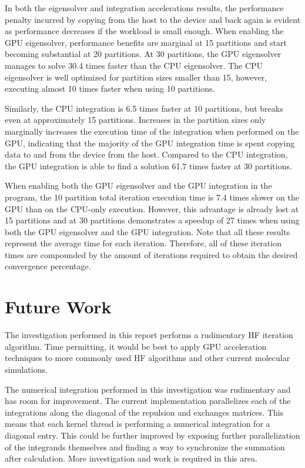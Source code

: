 \documentclass[conference, twoside]{IEEEtran}
\begin{document}
In both the eigensolver and integration accelerations results, the performance penalty incurred by copying from the host to the device and back again is evident as performance decreases if the workload is small enough. When enabling the GPU eigensolver, performance benefits are marginal at 15 partitions and start becoming substantial at 20 partitions. At 30 partitions, the GPU eigensolver manages to solve 30.4 times faster than the CPU eigensolver. The CPU eigensolver is well optimized for partition sizes smaller than 15, however, executing almost 10 times faster when using 10 partitions.

Similarly, the CPU integration is 6.5 times faster at 10 partitions, but breaks even at approximately 15 partitions. Increases in the partition sizes only marginally increases the execution time of the integration when performed on the GPU, indicating that the majority of the GPU integration time is spent copying data to and from the device from the host. Compared to the CPU integration, the GPU integration is able to find a solution 61.7 times faster at 30 partitions.

When enabling both the GPU eigensolver and the GPU integration in the program, the 10 partition total iteration execution time is 7.4 times slower on the GPU than on the CPU-only execution. However, this advantage is already lost at 15 partitions and at 30 partitions demonstrates a speedup of 27 times when using both the GPU eigensolver and the GPU integration. Note that all these results represent the average time for each iteration. Therefore, all of these iteration times are compounded by the amount of iterations required to obtain the desired convergence percentage.

\section{Future Work} %

The investigation performed in this report performs a rudimentary HF iteration algorithm. Time permitting, it would be best to apply GPU acceleration techniques to more commonly used HF algorithms and other current molecular simulations.

The numerical integration performed in this investigation was rudimentary and has room for improvement. The current implementation parallelizes each of the integrations along the diagonal of the repulsion and exchanges matrices. This means that each kernel thread is performing a numerical integration for a diagonal entry. This could be further improved by exposing further parallelization of the integrands themselves and finding a way to synchronize the summation after calculation. More investigation and work is required in this area.
\end{document}
